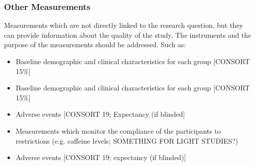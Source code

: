\subsubsection{Other Measurements}
\begin{prereg}
\begin{instruction}
Measurements which are not directly linked to the research question, but they can provide information about the quality of the study. The instruments and the purpose of the measurements should be addressed. Such as:
\begin{itemize}
    \item Baseline demographic and clinical characteristics for each group [CONSORT 15\%]
    \item Baseline demographic and clinical characteristics for each group [CONSORT 15\%]
    \item Adverse events [CONSORT 19; Expectancy (if blinded] 
    \item  Measurements which monitor the compliance of the participants to restrictions (e.g. caffeine levels; SOMETHING FOR LIGHT STUDIES?)
    \item Adverse events [CONSORT 19; expectancy (if blinded)]
\end{itemize}

\end{instruction}
\end{prereg}
